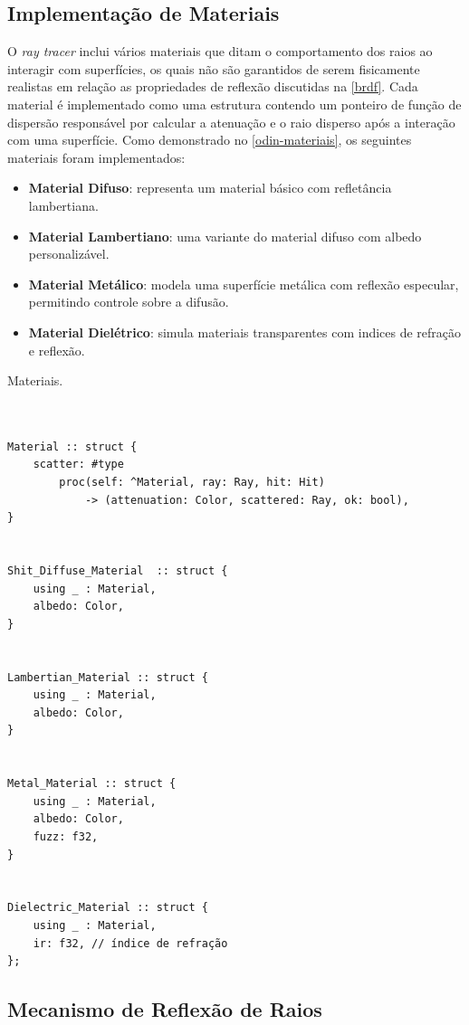 \documentclass[english, 
               brazil, 
               bsc] %
               {dcomp-abntex2}
\begin{document}
\subsection{Implementação de Materiais}


O \textit{ray tracer} inclui vários materiais que ditam o comportamento dos raios ao interagir com superfícies, os quais não são garantidos de serem fisicamente realistas em relação as propriedades de reflexão discutidas na \autoref{brdf}. Cada material é implementado como uma estrutura contendo um ponteiro de função de dispersão responsável por calcular a atenuação e o raio disperso após a interação com uma superfície. Como demonstrado no \autoref{odin-materiais}, os seguintes materiais foram implementados:


\begin{itemize}
\item \textbf{Material Difuso}: representa um material básico com refletância lambertiana.
\item \textbf{Material Lambertiano}: uma variante do material difuso com albedo personalizável.
\item \textbf{Material Metálico}: modela uma superfície metálica com reflexão especular, permitindo controle sobre a difusão.
\item \textbf{Material Dielétrico}: simula materiais transparentes com indices de refração e reflexão.
\end{itemize}


\begin{codigo}
\caption{\small Materiais.}
\label{odin-materiais}
\begin{verbatim}


Material :: struct {
    scatter: #type
        proc(self: ^Material, ray: Ray, hit: Hit)
            -> (attenuation: Color, scattered: Ray, ok: bool),
}


Shit_Diffuse_Material  :: struct {
    using _ : Material,
    albedo: Color,
}


Lambertian_Material :: struct {
    using _ : Material,
    albedo: Color,
}


Metal_Material :: struct {
    using _ : Material,
    albedo: Color,
    fuzz: f32,
}


Dielectric_Material :: struct {
    using _ : Material,
    ir: f32, // índice de refração
};
\end{verbatim}
\end{codigo}




\subsection{Mecanismo de Reflexão de Raios}
\end{document}
